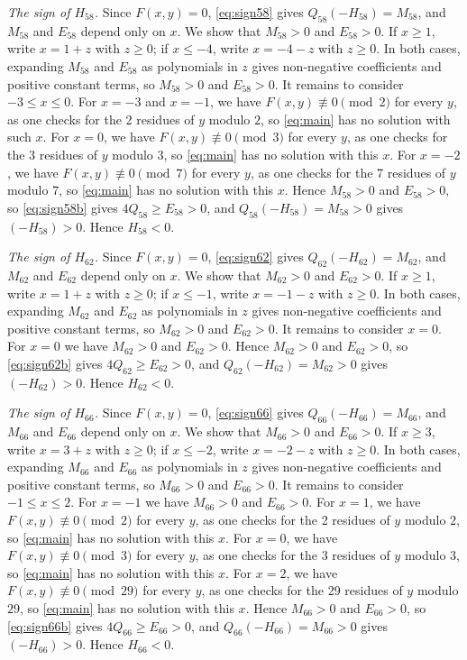 \documentclass[11pt]{article}
\begin{document}
\emph{The sign of $H_{58}$.} Since $F(x,y)=0$, \eqref{eq:sign58} gives $Q_{58}(-H_{58})=M_{58}$, and $M_{58}$ and $E_{58}$ depend only on $x$. We show that $M_{58}>0$ and $E_{58}>0$. If $x\geq1$, write $x=1+z$ with $z\geq0$; if $x\leq-4$, write $x=-4-z$ with $z\geq0$. In both cases, expanding $M_{58}$ and $E_{58}$ as polynomials in $z$ gives non-negative coefficients and positive constant terms, so $M_{58}>0$ and $E_{58}>0$. It remains to consider $-3\leq x\leq0$. For $x=-3$ and $x=-1$, we have $F(x,y)\not\equiv0\pmod{2}$ for every $y$, as one checks for the 2 residues of $y$ modulo $2$, so \eqref{eq:main} has no solution with such $x$. For $x=0$, we have $F(x,y)\not\equiv0\pmod{3}$ for every $y$, as one checks for the 3 residues of $y$ modulo $3$, so \eqref{eq:main} has no solution with this $x$. For $x=-2$, we have $F(x,y)\not\equiv0\pmod{7}$ for every $y$, as one checks for the 7 residues of $y$ modulo $7$, so \eqref{eq:main} has no solution with this $x$. Hence $M_{58}>0$ and $E_{58}>0$, so \eqref{eq:sign58b} gives $4Q_{58}\geq E_{58}>0$, and $Q_{58}(-H_{58})=M_{58}>0$ gives $(-H_{58})>0$. Hence $H_{58}<0$.

\emph{The sign of $H_{62}$.} Since $F(x,y)=0$, \eqref{eq:sign62} gives $Q_{62}(-H_{62})=M_{62}$, and $M_{62}$ and $E_{62}$ depend only on $x$. We show that $M_{62}>0$ and $E_{62}>0$. If $x\geq1$, write $x=1+z$ with $z\geq0$; if $x\leq-1$, write $x=-1-z$ with $z\geq0$. In both cases, expanding $M_{62}$ and $E_{62}$ as polynomials in $z$ gives non-negative coefficients and positive constant terms, so $M_{62}>0$ and $E_{62}>0$. It remains to consider $x=0$. For $x=0$ we have $M_{62}>0$ and $E_{62}>0$. Hence $M_{62}>0$ and $E_{62}>0$, so \eqref{eq:sign62b} gives $4Q_{62}\geq E_{62}>0$, and $Q_{62}(-H_{62})=M_{62}>0$ gives $(-H_{62})>0$. Hence $H_{62}<0$.

\emph{The sign of $H_{66}$.} Since $F(x,y)=0$, \eqref{eq:sign66} gives $Q_{66}(-H_{66})=M_{66}$, and $M_{66}$ and $E_{66}$ depend only on $x$. We show that $M_{66}>0$ and $E_{66}>0$. If $x\geq3$, write $x=3+z$ with $z\geq0$; if $x\leq-2$, write $x=-2-z$ with $z\geq0$. In both cases, expanding $M_{66}$ and $E_{66}$ as polynomials in $z$ gives non-negative coefficients and positive constant terms, so $M_{66}>0$ and $E_{66}>0$. It remains to consider $-1\leq x\leq2$. For $x=-1$ we have $M_{66}>0$ and $E_{66}>0$. For $x=1$, we have $F(x,y)\not\equiv0\pmod{2}$ for every $y$, as one checks for the 2 residues of $y$ modulo $2$, so \eqref{eq:main} has no solution with this $x$. For $x=0$, we have $F(x,y)\not\equiv0\pmod{3}$ for every $y$, as one checks for the 3 residues of $y$ modulo $3$, so \eqref{eq:main} has no solution with this $x$. For $x=2$, we have $F(x,y)\not\equiv0\pmod{29}$ for every $y$, as one checks for the 29 residues of $y$ modulo $29$, so \eqref{eq:main} has no solution with this $x$. Hence $M_{66}>0$ and $E_{66}>0$, so \eqref{eq:sign66b} gives $4Q_{66}\geq E_{66}>0$, and $Q_{66}(-H_{66})=M_{66}>0$ gives $(-H_{66})>0$. Hence $H_{66}<0$.
\end{document}
